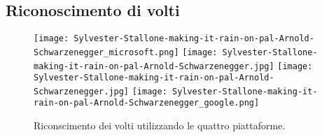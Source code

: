 \subsection{Riconoscimento di volti}\label{subsec:riconscimento-volti}
%
\begin{figure}[!h]
\begin{center}
	\texttt{[image: Sylvester-Stallone-making-it-rain-on-pal-Arnold-Schwarzenegger\_microsoft.png]}
	\texttt{[image: Sylvester-Stallone-making-it-rain-on-pal-Arnold-Schwarzenegger.jpg]}
	\texttt{[image: Sylvester-Stallone-making-it-rain-on-pal-Arnold-Schwarzenegger.jpg]}
	\texttt{[image: Sylvester-Stallone-making-it-rain-on-pal-Arnold-Schwarzenegger\_google.png]}
{\scriptsize \caption{Riconscimento dei volti utilizzando le quattro piattaforme.}
\label{fig:riconscimento-volti}}
\end{center}
\end{figure}
